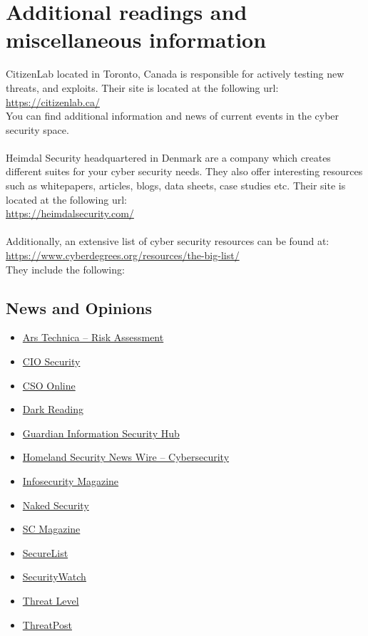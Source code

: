 \documentclass[a4paper, 12pt, titlepage]{report}
\begin{document}
\chapter{Additional readings and miscellaneous information}
CitizenLab located in Toronto, Canada is responsible for actively testing new threats, and exploits. Their site is located at the following url:\\
\url{https://citizenlab.ca/}\\
You can find additional information and news of current events in the cyber security space.\\\\
Heimdal Security headquartered in Denmark are a company which creates different suites for your cyber security needs. They also offer interesting resources such as whitepapers, articles, blogs, data sheets, case studies etc. Their site is located at the following url:\\
\url{https://heimdalsecurity.com/}\\\\
Additionally, an extensive list of cyber security resources can be found at:\\
\url{https://www.cyberdegrees.org/resources/the-big-list/}\\
They include the following:
\section{News and Opinions}
\begin{multicols}{2}
\begin{itemize}
\item \href{https://arstechnica.com/tag/security/}{Ars Technica – Risk Assessment}
\item \href{https://www.cio.com/category/security/}{CIO Security}
\item \href{https://www.csoonline.com/}{CSO Online}
\item \href{http://www.darkreading.com/}{Dark Reading}
\item \href{https://www.theguardian.com/media-network/information-security}{Guardian Information Security Hub}
\item \href{http://www.homelandsecuritynewswire.com/topics/cybersecurity}{Homeland Security News Wire – Cybersecurity}
\item \href{https://www.infosecurity-magazine.com/}{Infosecurity Magazine}
\item \href{https://nakedsecurity.sophos.com/}{Naked Security}
\item \href{https://www.scmagazine.com/}{SC Magazine}
\item \href{https://securelist.com/}{SecureList}
\item \href{http://securitywatch.pcmag.com/}{SecurityWatch}
\item \href{https://www.wired.com/category/threatlevel/}{Threat Level}
\item \href{https://threatpost.com/}{ThreatPost}
\end{itemize}
\end{multicols}
\end{document}
